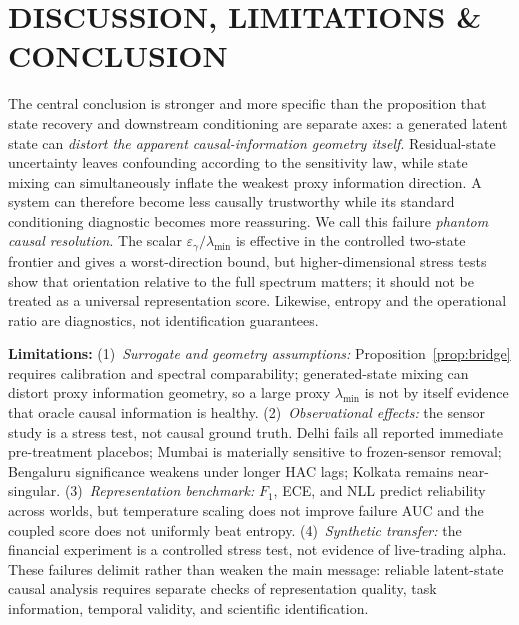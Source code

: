 \documentclass[twoside]{article}
\theoremstyle{definition}
\begin{document}
\vspace{-3mm}
\section{DISCUSSION, LIMITATIONS \& CONCLUSION}
\label{sec:conclusion}
The central conclusion is stronger and more specific than the proposition that state recovery and downstream conditioning are separate axes: a generated latent state can \emph{distort the apparent causal-information geometry itself}. Residual-state uncertainty leaves confounding according to the sensitivity law, while state mixing can simultaneously inflate the weakest proxy information direction. A system can therefore become less causally trustworthy while its standard conditioning diagnostic becomes more reassuring. We call this failure \emph{phantom causal resolution}. The scalar $\varepsilon_\gamma/\lambda_{\min}$ is effective in the controlled two-state frontier and gives a worst-direction bound, but higher-dimensional stress tests show that orientation relative to the full spectrum matters; it should not be treated as a universal representation score. Likewise, entropy and the operational ratio are diagnostics, not identification guarantees.

\textbf{Limitations:} (1)~\emph{Surrogate and geometry assumptions:} Proposition~\ref{prop:bridge} requires calibration and spectral comparability; generated-state mixing can distort proxy information geometry, so a large proxy $\lambda_{\min}$ is not by itself evidence that oracle causal information is healthy. (2)~\emph{Observational effects:} the sensor study is a stress test, not causal ground truth. Delhi fails all reported immediate pre-treatment placebos; Mumbai is materially sensitive to frozen-sensor removal; Bengaluru significance weakens under longer HAC lags; Kolkata remains near-singular. (3)~\emph{Representation benchmark:} $F_1$, ECE, and NLL predict reliability across worlds, but temperature scaling does not improve failure AUC and the coupled score does not uniformly beat entropy. (4)~\emph{Synthetic transfer:} the financial experiment is a controlled stress test, not evidence of live-trading alpha. These failures delimit rather than weaken the main message: reliable latent-state causal analysis requires separate checks of representation quality, task information, temporal validity, and scientific identification.

\clearpage
\end{document}
